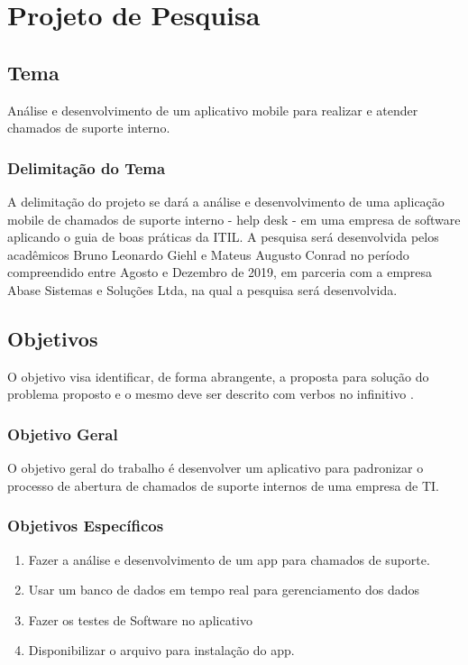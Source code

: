 \chapter{Projeto de Pesquisa} \label{chap:ResearchPlan}

\section{Tema} \label{sec::Theme}
Análise e desenvolvimento de um aplicativo mobile para realizar e atender chamados de suporte interno.

\subsection{Delimitação do Tema} \label{subsec::ThemeDelimitation}
A delimitação do projeto se dará a análise e desenvolvimento de uma aplicação mobile de chamados de suporte interno - help desk -  em uma empresa de software aplicando o guia de boas práticas da ITIL. A pesquisa será desenvolvida pelos acadêmicos Bruno Leonardo Giehl e Mateus Augusto Conrad no período compreendido entre Agosto e Dezembro de 2019, em parceria com a empresa Abase Sistemas e Soluções Ltda, na qual a pesquisa será desenvolvida.

\section{Objetivos} \label{sec:objective}
O objetivo visa identificar, de forma abrangente, a proposta para solução do problema proposto e o mesmo deve ser descrito com verbos no infinitivo \citep{lovato_2007}.

\subsection{Objetivo Geral}
O objetivo geral do trabalho é desenvolver um aplicativo para padronizar o processo de abertura de chamados de suporte internos de uma empresa de TI.
\subsection{Objetivos Específicos}
\begin{enumerate}
    \item Fazer a análise e desenvolvimento de um app para chamados de suporte.
    \item Usar um banco de dados em tempo real para gerenciamento dos dados
    \item Fazer os testes de Software no aplicativo 
    \item Disponibilizar o arquivo para instalação do app.
\end{enumerate}

